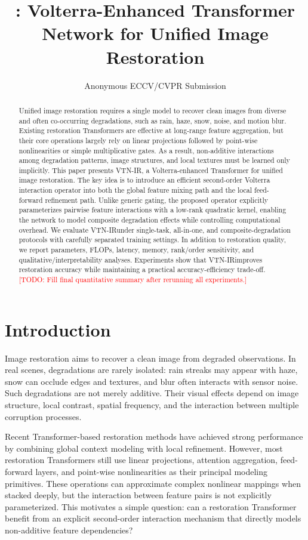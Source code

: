 \documentclass[10pt,twocolumn]{article}
\title{\ours: Volterra-Enhanced Transformer Network for Unified Image Restoration}
\author{Anonymous ECCV/CVPR Submission}
\date{}
\newcommand{\ours}{VTN-IR}
\newcommand{\todo}[1]{\textcolor{red}{[TODO: #1]}}
\begin{document}
\maketitle

\begin{abstract}
Unified image restoration requires a single model to recover clean images from diverse and often co-occurring degradations, such as rain, haze, snow, noise, and motion blur. Existing restoration Transformers are effective at long-range feature aggregation, but their core operations largely rely on linear projections followed by point-wise nonlinearities or simple multiplicative gates. As a result, non-additive interactions among degradation patterns, image structures, and local textures must be learned only implicitly. This paper presents \ours, a Volterra-enhanced Transformer for unified image restoration. The key idea is to introduce an efficient second-order Volterra interaction operator into both the global feature mixing path and the local feed-forward refinement path. Unlike generic gating, the proposed operator explicitly parameterizes pairwise feature interactions with a low-rank quadratic kernel, enabling the network to model composite degradation effects while controlling computational overhead. We evaluate \ours under single-task, all-in-one, and composite-degradation protocols with carefully separated training settings. In addition to restoration quality, we report parameters, FLOPs, latency, memory, rank/order sensitivity, and qualitative/interpretability analyses. Experiments show that \ours improves restoration accuracy while maintaining a practical accuracy-efficiency trade-off. \todo{Fill final quantitative summary after rerunning all experiments.}
\end{abstract}

\section{Introduction}
Image restoration aims to recover a clean image from degraded observations. In real scenes, degradations are rarely isolated: rain streaks may appear with haze, snow can occlude edges and textures, and blur often interacts with sensor noise. Such degradations are not merely additive. Their visual effects depend on image structure, local contrast, spatial frequency, and the interaction between multiple corruption processes.

Recent Transformer-based restoration methods have achieved strong performance by combining global context modeling with local refinement. However, most restoration Transformers still use linear projections, attention aggregation, feed-forward layers, and point-wise nonlinearities as their principal modeling primitives. These operations can approximate complex nonlinear mappings when stacked deeply, but the interaction between feature pairs is not explicitly parameterized. This motivates a simple question: can a restoration Transformer benefit from an explicit second-order interaction mechanism that directly models non-additive feature dependencies?
\end{document}
